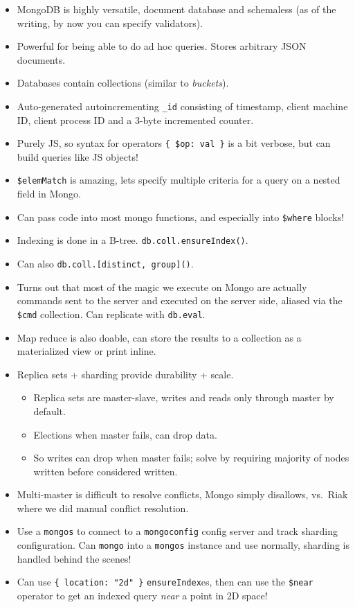 \documentclass[10pt]{article}
\begin{document}
\begin{itemize}
    \item MongoDB is highly versatile, document database and schemaless (as of
        the writing, by now you can specify validators).
    \item Powerful for being able to do ad hoc queries. Stores arbitrary JSON
        documents.
    \item Databases contain collections (similar to \emph{buckets}).
    \item Auto-generated autoincrementing \lstinline{_id} consisting of
        timestamp, client machine ID, client process ID and a 3-byte incremented
        counter.
    \item Purely JS, so syntax for operators \verb|{ $op: val }| is a bit
        verbose, but can build queries like JS objects!
    \item \verb|$elemMatch| is amazing, lets specify multiple criteria for a
        query on a nested field in Mongo.
    \item Can pass code into most mongo functions, and especially into
        \verb|$where| blocks!
    \item Indexing is done in a B-tree. \lstinline{db.coll.ensureIndex()}.
    \item Can also \lstinline{db.coll.[distinct, group]()}.
    \item Turns out that most of the magic we execute on Mongo are actually
        commands sent to the server and executed on the server side, aliased via
        the \verb|$cmd| collection. Can replicate with \lstinline{db.eval}.
    \item Map reduce is also doable, can store the results to a collection as a
        materialized view or print inline.
    \item Replica sets + sharding provide durability + scale.
        \begin{itemize}
            \item Replica sets are master-slave, writes and reads only through
                master by default.
            \item Elections when master fails, can drop data.
            \item So writes can drop when master fails; solve by requiring
                majority of nodes written before considered written.
        \end{itemize}
    \item Multi-master is difficult to resolve conflicts, Mongo simply
        disallows, vs.\ Riak where we did manual conflict resolution.
    \item Use a \lstinline{mongos} to connect to a \lstinline{mongoconfig}
        config server and track sharding configuration. Can \lstinline{mongo}
        into a \lstinline{mongos} instance and use normally, sharding is handled
        behind the scenes!
    \item Can use \lstinline${ location: "2d" }$ \lstinline{ensureIndex}es, then
        can use the \verb|$near| operator to get an indexed query \emph{near} a
        point in 2D space!
\end{itemize}
\end{document}
